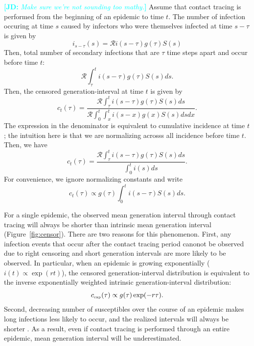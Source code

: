 \documentclass[12pt]{article}
\newcommand{\RR}{\ensuremath{{\mathcal R}}}
\newcommand{\tsub}[2]{#1_{{\textrm{\tiny #2}}}}
\newcommand{\comment}[3]{\textcolor{#1}{\textbf{[#2: }\textsl{#3}\textbf{]}}}
\newcommand{\jd}[1]{\comment{cyan}{JD}{#1}}
\begin{document}
\jd{Make sure we're not sounding too mathy.}
Assume that contact tracing is performed from the beginning of an epidemic to time $t$.
The number of infection occuring at time $s$ caused by infectors who were themselves infected at time $s-\tau$ is given by
\begin{equation}
i_{s-\tau}(s) = \RR i(s-\tau) g(\tau) S(s)
\end{equation}
Then, total number of secondary infections that are $\tau$ time steps apart and occur before time $t$:
\begin{equation}
\RR \int_\tau^t i(s-\tau) g(\tau) S(s) ds.
\end{equation}
Then, the censored generation-interval at time $t$ is given by
\begin{equation}
c_t(\tau)= \frac{\RR \int_\tau^t i(s-\tau) g(\tau) S(s) ds}{\RR \int_0^t \int_x^t i(s-x) g(x) S(s) ds dx}.
\end{equation}
The expression in the denominator is equivalent to cumulative incidence at time $t$; the intuition here is that we are normalizing acrosss all incidence before time $t$.
Then, we have
\begin{equation}
c_t(\tau) = \frac{\RR \int_\tau^t i(s-\tau) g(\tau) S(s) ds}{\int_0^t i(s) ds}.
\end{equation}
For convenience, we ignore normalizing constants and write
\begin{equation}\label{eq:obsg}
c_t(\tau) \propto g(\tau) \int_{0}^t i(s-\tau) S(s) ds.
\end{equation}

For a single epidemic, the observed mean generation interval through contact tracing will always be shorter than intrinsic mean generation interval (Figure~\ref{fig:censor}).
There are two reasons for this phenomenon.
First, any infection events that occur after the contact tracing period canonot be observed due to right censoring and short generation intervals are more likely to be observed.
In particular, when an epidemic is growing exponentially ($i(t) \propto \exp(rt)$), 
the censored generation-interval distribution is equivalent to the inverse exponentially weighted intrinsic generation-interval distribution:
\begin{equation}
\tsub{c}{exp}(\tau) \propto g(\tau) \exp(-r\tau).
\label{eq:exp}
\end{equation}
Second, decreasing number of susceptibles over the course of an epidemic makes long infections less likely to occur, and the realized intervals will always be shorter \citep{champredon2015intrinsic}.
As a result, even if contact tracing is performed through an entire epidemic, mean generation interval will be underestimated.
\end{document}
